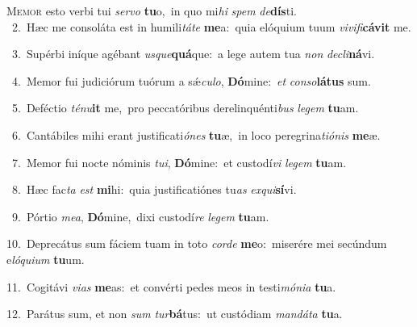\lettrine{\initial\textcolor{\initialcolor}{M}}{emor} esto verbi tui \textit{ser}\-\textit{vo} \textbf{tu}\-o,~\star in quo mi\textit{hi} \textit{spem} \textit{de}\-\textbf{dís}ti.\\
{\numbfont\textcolor{\numbcolor}{~2.}}~Hæc me consoláta est in humili\-\textit{tá}\-\textit{te} \textbf{me}\-a:~\star quia elóquium tuum \textit{vi}\-\textit{vi}\textit{fi}\textbf{cá}\textbf{vit} me.\par
{\numbfont\textcolor{\numbcolor}{~3.}}~Supérbi iníque agébant \textit{us}\-\textit{que}\textbf{quá}que:~\star a lege autem tua \textit{non} \textit{de}\-\textit{cli}\textbf{ná}vi.\par
{\numbfont\textcolor{\numbcolor}{~4.}}~Memor fui judiciórum tuórum a sǽ\-\textit{cu}\-\textit{lo}, \textbf{Dó}\-mine:~\star \textit{et} \textit{con}\-\textit{so}\textbf{lá}\textbf{tus} sum.\par
{\numbfont\textcolor{\numbcolor}{~5.}}~Deféctio \textit{té}\-\textit{nu}\textbf{it} me,~\star pro peccatóribus derelinquénti\textit{bus} \textit{le}\-\textit{gem} \textbf{tu}\-am.\par
{\numbfont\textcolor{\numbcolor}{~6.}}~Cantábiles mihi erant justificati\-\textit{ó}\-\textit{nes} \textbf{tu}\-æ,~\star in loco peregrina\-\textit{ti}\-\textit{ó}\textit{nis} \textbf{me}\-æ.\par
{\numbfont\textcolor{\numbcolor}{~7.}}~Memor fui nocte nóminis \textit{tu}\-\textit{i}, \textbf{Dó}\-mine:~\star et custodí\textit{vi} \textit{le}\-\textit{gem} \textbf{tu}\-am.\par
{\numbfont\textcolor{\numbcolor}{~8.}}~Hæc fac\textit{ta} \textit{est} \textbf{mi}\-hi:~\star quia justificatiónes tu\textit{as} \textit{ex}\-\textit{qui}\textbf{sí}vi.\par
{\numbfont\textcolor{\numbcolor}{~9.}}~Pórtio \textit{me}\-\textit{a}, \textbf{Dó}\-mine,~\star dixi custodí\textit{re} \textit{le}\-\textit{gem} \textbf{tu}\-am.\par
{\numbfont\textcolor{\numbcolor}{10.}}~Deprecátus sum fáciem tuam in toto \textit{cor}\-\textit{de} \textbf{me}\-o:~\star miserére mei secúndum e\-\textit{ló}\-\textit{qui}\textit{um} \textbf{tu}\-um.\par
{\numbfont\textcolor{\numbcolor}{11.}}~Cogitávi \textit{vi}\-\textit{as} \textbf{me}\-as:~\star et convérti pedes meos in testi\-\textit{mó}\-\textit{ni}\textit{a} \textbf{tu}\-a.\par
{\numbfont\textcolor{\numbcolor}{12.}}~Parátus sum, et non \textit{sum} \textit{tur}\-\textbf{bá}tus:~\star ut custódiam \textit{man}\-\textit{dá}\textit{ta} \textbf{tu}\-a.\par
